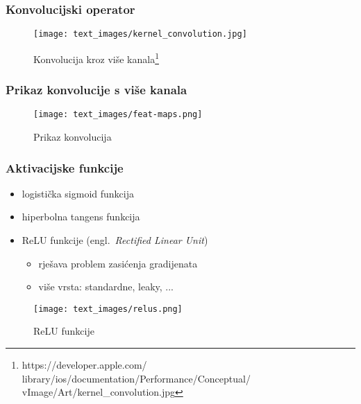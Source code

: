 \documentclass[utf8]{beamer}
\newcommand{\engl}[1]{(engl.~\emph{#1})}
\begin{document}

\begin{frame}
\frametitle{Konvolucijski operator}

\begin{figure}[htb]
\centering
\texttt{[image: text\_images/kernel\_convolution.jpg]}
\caption{Konvolucija kroz više kanala\footnote{
https://developer.apple.com/ library/ios/documentation/Performance/Conceptual/ vImage/Art/kernel\_convolution.jpg}}
\end{figure}

\end{frame}

\begin{frame}
\frametitle{Prikaz konvolucije s više kanala}

\begin{figure}[htb]
\centering
\texttt{[image: text\_images/feat-maps.png]}
\caption{Prikaz konvolucija}
\end{figure}

\end{frame}


\begin{frame}

\frametitle{Aktivacijske funkcije}

\begin{itemize}
  \item logistička sigmoid funkcija %
  \item hiperbolna tangens funkcija %
  \item ReLU funkcije \engl{Rectified Linear Unit}
  \begin{itemize}
    \item rješava problem zasićenja gradijenata
    \item više vrsta: standardne, leaky, ...
  \end{itemize}
\end{itemize}

\begin{figure}[htb]
  \centering
  \texttt{[image: text\_images/relus.png]}
  \caption{ReLU funkcije}
\end{figure}

\end{frame}
\end{document}

